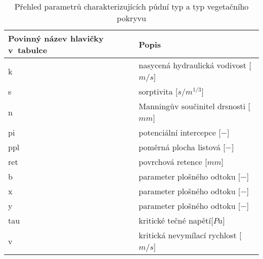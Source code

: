 \begin{table}%
  \centering
  \caption{Přehled parametrů charakterizujících půdní typ a typ vegetačního pokryvu}
  {\small
    \begin{tabular}{p{2cm}l}
    \hline  \hline
    Povinný název hlavičky v~tabulce & Popis \\
    \hline
        k&nasycená hydraulická vodivost [$m/s$] \\
        s&sorptivita [$s/m^{1/3}$] \\
        n&Manningův součinitel drsnosti [$mm$] \\
        pi&potenciální intercepce [$-$] \\
        ppl&poměrná plocha listová [$-$] \\
        ret&povrchová retence [$mm$] \\
        b&parameter plošného odtoku [$-$] \\
        x&parameter plošného odtoku [$-$] \\
        y&parameter plošného odtoku [$-$] \\
        tau&kritické tečné napětí[$Pa$]  \\
        v&kritická nevymílací rychlost [$m/s$] \\
    \hline  \hline
    \end{tabular}%
  }
  \label{tab:soilveg}%
\end{table}%
